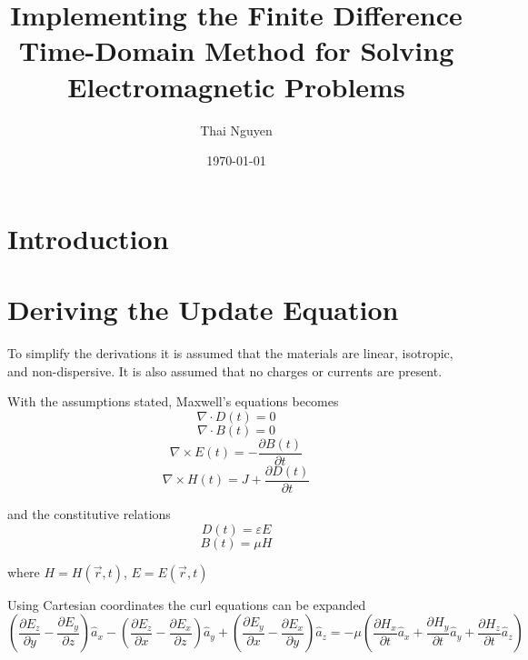 \documentclass{article}
\begin{document}
\title{Implementing the Finite Difference Time-Domain Method for Solving Electromagnetic Problems}
\author{Thai Nguyen}
\date{\today}

\maketitle
\tableofcontents
\newpage

\section{Introduction}

\section{Deriving the Update Equation}
To simplify the derivations it is assumed that the materials are linear, isotropic, and non-dispersive. It is also assumed that no charges or currents are present.

With the assumptions stated, Maxwell's equations becomes
\begin{equation}
\nabla \cdot D(t) = 0
\end{equation}
\begin{equation}
\nabla \cdot B(t) = 0
\end{equation}
\begin{equation}
\nabla \times E(t) = -\frac{\partial B(t)}{\partial t}
\end{equation}
\begin{equation}
\nabla \times H(t) = J + \frac{\partial D(t)}{\partial t}
\end{equation}

and the constitutive relations
\begin{equation}
D(t) = \varepsilon E
\end{equation}
\begin{equation}
B(t) = \mu H
\end{equation}

where $H = H(\vec{r}, t)$, $E = E(\vec{r}, t)$

Using Cartesian coordinates the curl equations can be expanded
\begin{equation}
\left( \frac{\partial E_z}{\partial y}  - \frac{\partial E_y}{\partial z}\right)  \hat{a}_x - \left( \frac{\partial E_z}{\partial x}  - \frac{\partial E_x}{\partial z}\right)  \hat{a}_y + \left( \frac{\partial E_y}{\partial x}  - \frac{\partial E_x}{\partial y}\right)  \hat{a}_z = -\mu \left(\frac{\partial H_x}{\partial t} \hat{a}_x + \frac{\partial H_y}{\partial t} \hat{a}_y + \frac{\partial H_z}{\partial t} \hat{a}_z \right)
\end{equation}
\end{document}
